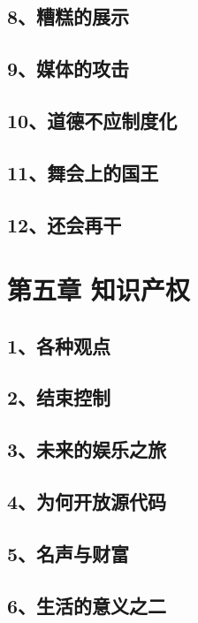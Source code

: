 \documentclass[12pt,UTF8]{ctexbook}
\begin{document}
\section{8、糟糕的展示}
\section{9、媒体的攻击}
\section{10、道德不应制度化}
\section{11、舞会上的国王}

\section{12、还会再干}

\chapter{第五章 知识产权}

\section{1、各种观点}
\section{2、结束控制}
\section{3、未来的娱乐之旅}
\section{4、为何开放源代码}
\section{5、名声与财富}
\section{6、生活的意义之二}

\backmatter
\end{document}
